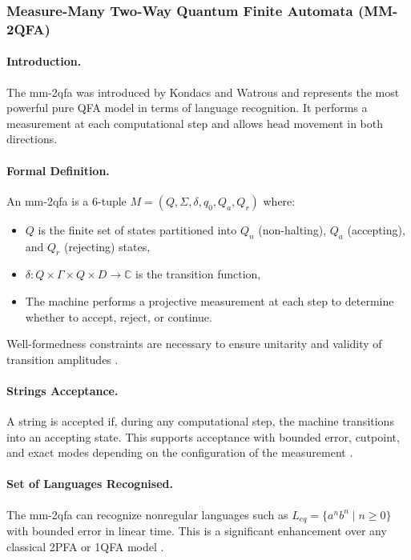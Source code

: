 \subsubsection{Measure-Many Two-Way Quantum Finite Automata (MM-2QFA)}

\paragraph{Introduction.} The \gls{mm-2qfa} was introduced by Kondacs and Watrous \cite{kondacs1997power} and represents the most powerful pure QFA model in terms of language recognition. It performs a measurement at each computational step and allows head movement in both directions.

\paragraph{Formal Definition.} An \gls{mm-2qfa} is a 6-tuple $M = (Q, \Sigma, \delta, q_0, Q_a, Q_r)$ where:
\begin{itemize}
    \item $Q$ is the finite set of states partitioned into $Q_n$ (non-halting), $Q_a$ (accepting), and $Q_r$ (rejecting) states,
    \item $\delta: Q \times \Gamma \times Q \times D \to \mathbb{C}$ is the transition function,
    \item The machine performs a projective measurement at each step to determine whether to accept, reject, or continue.
\end{itemize}
Well-formedness constraints are necessary to ensure unitarity and validity of transition amplitudes \cite{kondacs1997power}.

\paragraph{Strings Acceptance.} A string is accepted if, during any computational step, the machine transitions into an accepting state. This supports acceptance with bounded error, cutpoint, and exact modes depending on the configuration of the measurement \cite{kondacs1997power}.

\paragraph{Set of Languages Recognised.} The \gls{mm-2qfa} can recognize nonregular languages such as $L_{eq} = \{ a^n b^n \mid n \geq 0 \}$ with bounded error in linear time. This is a significant enhancement over any classical 2PFA or 1QFA model \cite{kondacs1997power}.

